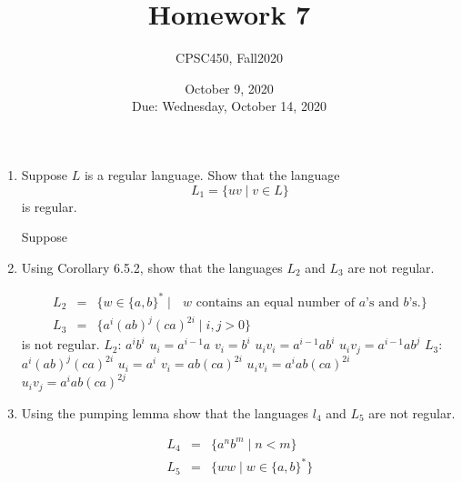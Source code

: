 \documentclass{article}
\title{Homework 7}
\author{CPSC450, Fall2020}
\date{October 9, 2020\\
Due: Wednesday, October 14, 2020}
\begin{document}
\maketitle

\begin{enumerate}

\item Suppose $L$ is a regular language. Show that the language
  \[
  L_1 = \{ uv \mid v \in L \}
  \]
  is regular.
  
  \newline Suppose

\item Using Corollary 6.5.2, show that the languages $L_2$ and $L_3$
  are not regular.

\begin{eqnarray*}
  L_2 &=& \{ w \in \{a, b\}^* \mid \mbox{ $w$ contains an equal number
    of $a$'s and $b$'s.} \}\\
  L_3 &=& \{ a^i(ab)^j(ca)^{2i} \mid i, j > 0 \}
\end{eqnarray*}
  is not regular.
  \newline $L_2$: $a^ib^i$
  \newline $u_i = a^{i-1}a$
  \newline $v_i = b^i$
  \newline $u_iv_i = a^{i-1}ab^i$
  \newline $u_iv_j = a^{i-1}ab^j$
  \newline
  \newline $L_3$: $a^i(ab)^j(ca)^{2i}$
  \newline $u_i = a^i$
  \newline $v_i = ab(ca)^{2i}$
  \newline $u_iv_i = a^iab(ca)^{2i}$
  \newline $u_iv_j = a^iab(ca)^{2j}$

\item Using the pumping lemma show that the languages $l_4$ and $L_5$
  are not regular.

  \begin{eqnarray*}
    L_4 &=& \{ a^nb^m \mid n < m \}\\
    L_5 &=& \{ ww \mid w \in \{a, b\}^* \}
  \end{eqnarray*}
  

\end{enumerate}
\end{document}

